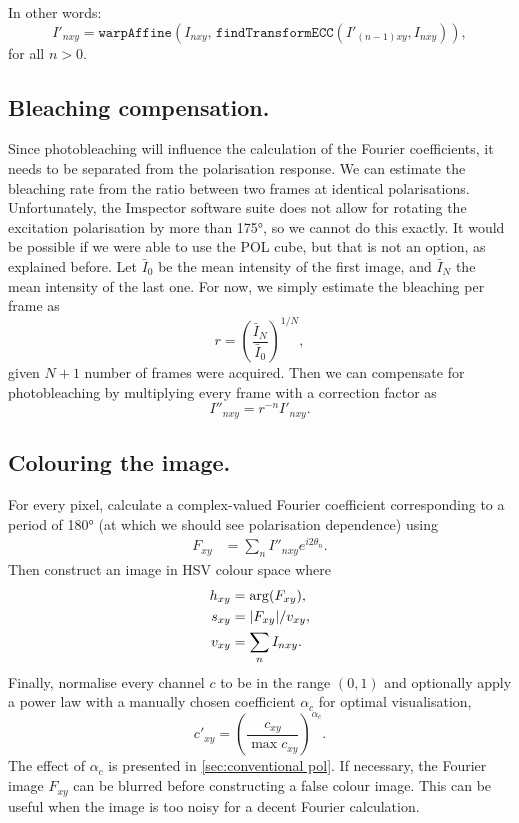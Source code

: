 \noindent In other words:
\begin{equation}
	I'_{nxy} = \texttt{warpAffine}\left(
		I_{nxy},\,
		\texttt{findTransformECC}\left(I'_{(n-1)xy}, I_{nxy}\right)
	\right),
\end{equation}
for all $ n>0 $.

\subsection{Bleaching compensation.} Since photobleaching will influence the calculation of the Fourier coefficients, it needs to be separated from the polarisation response. We can estimate the bleaching rate from the ratio between two frames at identical polarisations. Unfortunately, the Imspector software suite does not allow for rotating the excitation polarisation by more than \ang{175}, so we cannot do this exactly. It would be possible if we were able to use the POL cube, but that is not an option, as explained before. Let $ \bar{I}_0 $ be the mean intensity of the first image, and $ \bar{I}_N $ the mean intensity of the last one. For now, we simply estimate the bleaching per frame as
\begin{equation}
	r = \left( \frac{\bar{I}_N}{\bar{I}_0} \right) ^{1/N},
\end{equation}
given $ N+1 $ number of frames were acquired. Then we can compensate for photobleaching by multiplying every frame with a correction factor as
\begin{equation}
	I''_{nxy} = r^{-n} I'_{nxy}.
\end{equation}

\subsection{Colouring the image.} For every pixel, calculate a complex-valued Fourier coefficient corresponding to a period of \ang{180} (at which we should see polarisation dependence) using
\begin{align}
	F_{xy} &= \sum_n I''_{nxy} e^{i2\theta_n}.
\end{align}
Then construct an image in HSV colour space where 
\begin{align}
	h_{xy} &= \arg (F_{xy}),\\
	s_{xy} &= \abs{F_{xy}}/v_{xy},\\
	v_{xy} &= \sum_n I_{nxy}.
\end{align}
Finally, normalise every channel $ c $ to be in the range $ (0,1) $ and optionally apply a power law with a manually chosen coefficient $ \alpha_c $ for optimal visualisation,
\begin{equation}
	c'_{xy} = \left( \frac{c_{xy}}{\max c_{xy}} \right)^{\alpha_c}.
\end{equation}
The effect of $ \alpha_c $ is presented in \autoref{sec:conventional pol}. If necessary, the Fourier image $ F_{xy} $ can be blurred before constructing a false colour image. This can be useful when the image is too noisy for a decent Fourier calculation.

